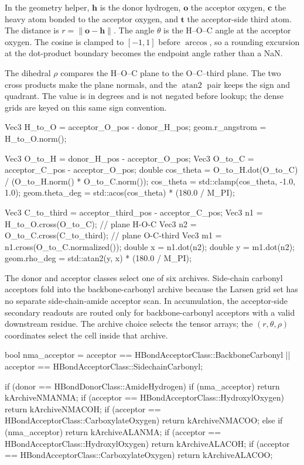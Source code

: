 \documentclass[11pt]{article}
\begin{document}
In the geometry helper, \(\bm h\) is the donor hydrogen, \(\bm o\) the
acceptor oxygen, \(\bm c\) the heavy atom bonded to the acceptor oxygen, and
\(\bm t\) the acceptor-side third atom. The distance is
\(r=\|\bm o-\bm h\|\). The angle \(\theta\) is the H--O--C angle at the
acceptor oxygen. The cosine is clamped to \([-1,1]\) before \(\arccos\), so a
rounding excursion at the dot-product boundary becomes the endpoint angle
rather than a NaN.

The dihedral \(\rho\) compares the H--O--C plane to the O--C--third plane. The
two cross products make the plane normals, and the \(\operatorname{atan2}\)
pair keeps the sign and quadrant. The value is in degrees and is not negated
before lookup; the dense grids are keyed on this same sign convention.

\begin{codebox}
Vec3 H_to_O = acceptor_O_pos - donor_H_pos;
geom.r_angstrom = H_to_O.norm();

Vec3 O_to_H = donor_H_pos    - acceptor_O_pos;
Vec3 O_to_C = acceptor_C_pos - acceptor_O_pos;
double cos_theta = O_to_H.dot(O_to_C) /
                   (O_to_H.norm() * O_to_C.norm());
cos_theta = std::clamp(cos_theta, -1.0, 1.0);
geom.theta_deg = std::acos(cos_theta) * (180.0 / M_PI);

Vec3 C_to_third = acceptor_third_pos - acceptor_C_pos;
Vec3 n1 = H_to_O.cross(O_to_C);             // plane H-O-C
Vec3 n2 = O_to_C.cross(C_to_third);         // plane O-C-third
Vec3 m1 = n1.cross(O_to_C.normalized());
double x = n1.dot(n2);
double y = m1.dot(n2);
geom.rho_deg = std::atan2(y, x) * (180.0 / M_PI);
\end{codebox}

The donor and acceptor classes select one of six archives. Side-chain
carbonyl acceptors fold into the backbone-carbonyl archive because the Larsen
grid set has no separate side-chain-amide acceptor scan. In accumulation, the
acceptor-side secondary readouts are routed only for backbone-carbonyl
acceptors with a valid downstream residue. The archive choice selects the
tensor arrays; the \((r,\theta,\rho)\) coordinates select the cell inside
that archive.

\begin{codebox}
bool nma_acceptor =
    acceptor == HBondAcceptorClass::BackboneCarbonyl ||
    acceptor == HBondAcceptorClass::SidechainCarbonyl;

if (donor == HBondDonorClass::AmideHydrogen) {
    if (nma_acceptor)                                      return kArchiveNMANMA;
    if (acceptor == HBondAcceptorClass::HydroxylOxygen)    return kArchiveNMACOH;
    if (acceptor == HBondAcceptorClass::CarboxylateOxygen) return kArchiveNMACOO;
} else {
    if (nma_acceptor)                                      return kArchiveALANMA;
    if (acceptor == HBondAcceptorClass::HydroxylOxygen)    return kArchiveALACOH;
    if (acceptor == HBondAcceptorClass::CarboxylateOxygen) return kArchiveALACOO;
}
\end{codebox}
\end{document}
